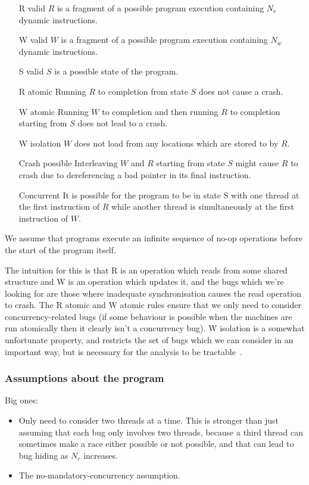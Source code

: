 \documentclass[12pt,a4paper]{book}
\begin{document}
\begin{itemize}
\item[R valid] $R$ is a fragment of a possible program execution containing $N_r$ dynamic instructions.
\item[W valid] $W$ is a fragment of a possible program execution containing $N_w$ dynamic instructions.
\item[S valid] $S$ is a possible state of the program.
\item[R atomic] Running $R$ to completion from state $S$ does not cause a crash.
\item[W atomic] Running $W$ to completion and then running $R$ to completion starting from $S$ does not lead to a crash.
\item[W isolation] $W$ does not load from any locations which are stored to by $R$.
\item[Crash possible] Interleaving $W$ and $R$ starting from state $S$ might cause $R$ to crash due to dereferencing a bad pointer in its final instruction.
\item[Concurrent] It is possible for the program to be in state S with one thread at the first instruction of $R$ while another thread is simultaneously at the first instruction of $W$.
\end{itemize}

We assume that programs execute an infinite sequence of no-op operations before the start of the program itself.

The intuition for this is that R is an operation which reads from some shared structure and W is an operation which updates it, and the bugs which we're looking for are those where inadequate synchronisation causes the read operation to crash.
The R atomic and W atomic rules ensure that we only need to consider concurrency-related bugs (if some behaviour is possible when the machines are run atomically then it clearly isn't a concurrency bug).
W isolation is a somewhat unfortunate property, and restricts the set of bugs which we can consider in an important way, but is necessary for the analysis to be tractable~\needCite{}.

\subsubsection{Assumptions about the program}

Big ones:

\begin{itemize}
\item
  Only need to consider two threads at a time.
  This is stronger than just assuming that each bug only involves two threads, because a third thread can sometimes make a race either possible or not possible, and that can lead to bug hiding as $N_r$ increases.
\item
  The no-mandatory-concurrency assumption.
\end{itemize}
\end{document}
